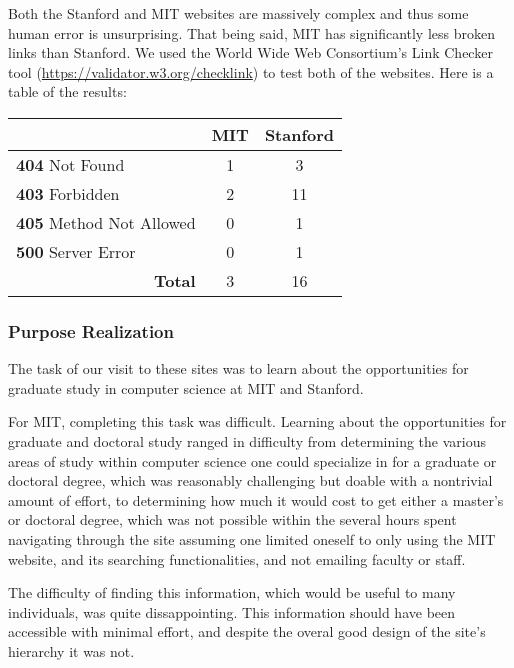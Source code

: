 Both the Stanford and MIT websites are massively complex and thus some human error is unsurprising.
That being said, MIT has significantly less broken links than Stanford. We used the
World Wide Web Consortium's Link Checker tool (\url{https://validator.w3.org/checklink})
to test both of the websites. Here is a table of the results:

\begin{center}
\begin{tabular}{|l|c|c|}
\hline
                                     & \textbf{MIT} & \textbf{Stanford} \\ \hline
\textbf{404} Not Found               & 1            & 3                 \\ \hline
\textbf{403} Forbidden               & 2            & 11                \\ \hline
\textbf{405} Method Not Allowed      & 0            & 1                 \\ \hline
\textbf{500} Server Error            & 0            & 1                 \\ \hline \hline
\multicolumn{1}{|r|}{\textbf{Total}} & 3            & 16                \\ \hline
\end{tabular}
\end{center}

\subsubsection*{Purpose Realization}

The task of our visit to these sites was to learn about the opportunities for
graduate study in computer science at MIT and Stanford.

For MIT, completing this task was difficult. Learning about the opportunities for
graduate and doctoral study ranged in difficulty from determining the various areas
of study within computer science one could specialize in for a graduate or doctoral
degree, which was reasonably challenging but doable with a nontrivial amount of effort,
to determining how much it would cost to get either a master's or doctoral degree,
which was not possible within the several hours spent navigating through the site
assuming one limited oneself to only using the MIT website, and its searching
functionalities, and not emailing faculty or staff.

The difficulty of finding this information, which would be useful to many individuals, was
quite dissappointing. This information should have been accessible with minimal effort, and
despite the overal good design of the site's hierarchy it was not.

